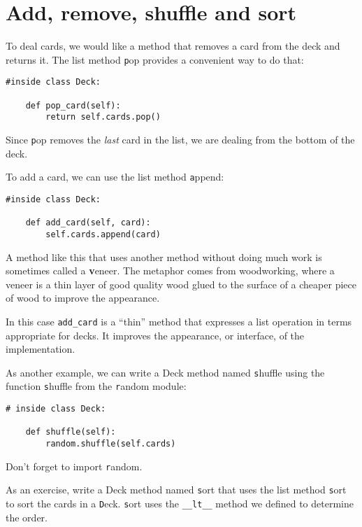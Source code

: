 \documentclass[
DIV=11,
fontsize=12,
twoside,
headinclude=false,
titlepage=firstiscover,
abstract=true,
headsepline=true,
footsepline=true,
chapterprefix=true, %
headings=big,
bibliography=totoc,%
captions=tableheading
]{scrbook}
\theoremstyle{definition}
\begin{document}
\section{Add, remove, shuffle and sort}

To deal cards, we would like a method that
removes a card from the deck and returns it.
The list method {\texttt pop} provides a convenient way to do that:

\begin{lstlisting}
#inside class Deck:

    def pop_card(self):
        return self.cards.pop()
\end{lstlisting}
%
Since {\texttt pop} removes the {\em last} card in the list, we are
dealing from the bottom of the deck.

To add a card, we can use the list method {\texttt append}:

\begin{lstlisting}
#inside class Deck:

    def add_card(self, card):
        self.cards.append(card)
\end{lstlisting}
%
A method like this that uses another method without doing
much work is sometimes called a {\textbf veneer}.  The metaphor
comes from woodworking, where a veneer is a thin
layer of good quality wood glued to the surface of a cheaper piece of
wood to improve the appearance.

In this case \verb"add_card" is a ``thin'' method that expresses
a list operation in terms appropriate for decks.  It
improves the appearance, or interface, of the
implementation.

As another example, we can write a Deck method named {\texttt shuffle}
using the function {\texttt shuffle} from the {\texttt random} module:

\begin{lstlisting}
# inside class Deck:
            
    def shuffle(self):
        random.shuffle(self.cards)
\end{lstlisting}
%
Don't forget to import {\texttt random}.

As an exercise, write a Deck method named {\texttt sort} that uses the
list method {\texttt sort} to sort the cards in a {\texttt Deck}.  {\texttt sort}
uses the \verb"__lt__" method we defined to determine the order.
 
\end{document}
